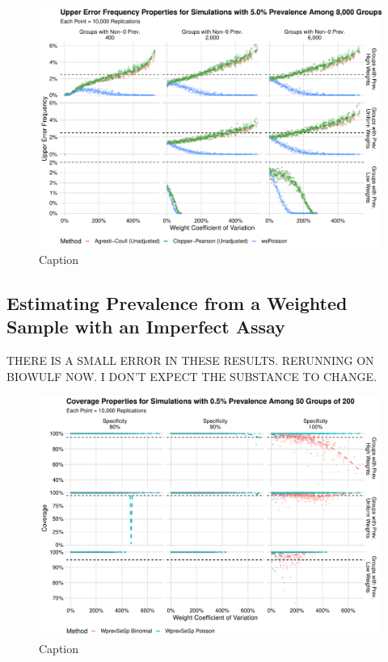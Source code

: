 \documentclass[AMA,STIX1COL]{WileyNJD-v2}
\begin{document}
\begin{figure}
    \centering
    \includegraphics[width=\textwidth]{figures/perfect_upper_error_frequency_8000_0_05_reduced.pdf}
    \caption{Caption}
    \label{fig:perfect_upper_error_frequency_8000_0_05_reduced.pdf}
\end{figure}

\subsection{Estimating Prevalence from a Weighted Sample with an  Imperfect Assay}

THERE IS A SMALL ERROR IN THESE RESULTS. RERUNNING ON BIOWULF NOW. I DON'T EXPECT THE SUBSTANCE TO CHANGE.

\begin{figure}
    \centering
    \includegraphics[width=\textwidth]{figures/imperfect_coverage_50_0_005_reduced.pdf}
    \caption{Caption}
    \label{fig:imperfect_coverage_50_0_005_reduced}
\end{figure}
\end{document}
